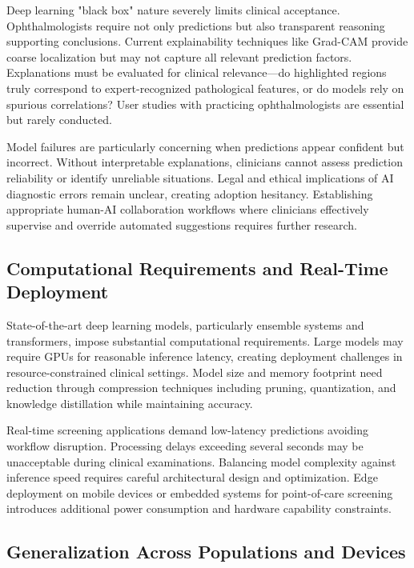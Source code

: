 Deep learning "black box" nature severely limits clinical acceptance. Ophthalmologists require not only predictions but also transparent reasoning supporting conclusions. Current explainability techniques like Grad-CAM provide coarse localization but may not capture all relevant prediction factors. Explanations must be evaluated for clinical relevance—do highlighted regions truly correspond to expert-recognized pathological features, or do models rely on spurious correlations? User studies with practicing ophthalmologists are essential but rarely conducted.

Model failures are particularly concerning when predictions appear confident but incorrect. Without interpretable explanations, clinicians cannot assess prediction reliability or identify unreliable situations. Legal and ethical implications of AI diagnostic errors remain unclear, creating adoption hesitancy. Establishing appropriate human-AI collaboration workflows where clinicians effectively supervise and override automated suggestions requires further research.

\subsection{Computational Requirements and Real-Time Deployment}

State-of-the-art deep learning models, particularly ensemble systems and transformers, impose substantial computational requirements. Large models may require GPUs for reasonable inference latency, creating deployment challenges in resource-constrained clinical settings. Model size and memory footprint need reduction through compression techniques including pruning, quantization, and knowledge distillation while maintaining accuracy.

Real-time screening applications demand low-latency predictions avoiding workflow disruption. Processing delays exceeding several seconds may be unacceptable during clinical examinations. Balancing model complexity against inference speed requires careful architectural design and optimization. Edge deployment on mobile devices or embedded systems for point-of-care screening introduces additional power consumption and hardware capability constraints.

\subsection{Generalization Across Populations and Devices}

